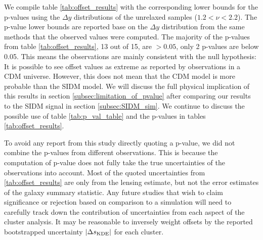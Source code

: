 We compile table \ref{tab:offset_results} with the corresponding lower bounds
for the p-values using
the $\Delta y$ distributions of the unrelaxed samples ($1.2 < \nu < 2.2$). 
The p-value lower bounds are reported base on the $\Delta y$ distribution 
from the same methods that the observed values were computed. 
The majority of the p-values from table \ref{tab:offset_results}, 13 out of 15, are
$ > 0.05$, only 2 p-values are below 0.05. 
This means the observations are mainly consistent with the null hypothesis: 
It is possible to see offset values as extreme as reported by observations
in a CDM universe. 
However, this does not mean that the CDM model is more probable than the SIDM model. 
We will discuss the full physical implication of this results in section  
\ref{subsec:limitation_of_pvalue} after comparing our results to the SIDM signal 
in section \ref{subsec:SIDM_sim}. 
We continue to discuss the possible use of table \ref{tab:p_val_table} and
the p-values in tables \ref{tab:offset_results}.

To avoid any report from this study directly quoting a p-value, we did not
combine the p-values from different observations. 
This is because the computation of p-value does not fully
take the true uncertainties of the observations into account. 
Most of the quoted uncertainties from \ref{tab:offset_results} are only 
from the lensing estimate, but not the error estimates of the galaxy summary 
statistic. 
Any future studies that wish to claim significance or rejection based on
comparison to a simulation will 
need to carefully track down the contribution of uncertainties from each aspect
of the cluster analysis.  
It may be reasonable to inversely weight offsets by the 
reported bootstrapped uncertainty $|\Delta s_{\rm KDE}|$ for each cluster.

